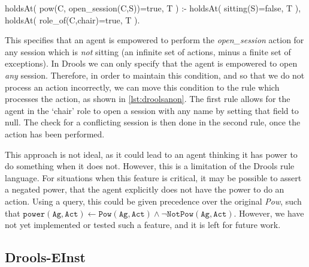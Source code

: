 \begin{prologinline}
holdsAt( pow(C, open_session(C,S))=true, T ) :-
	holdsAt( sitting(S)=false, T ),
	holdsAt( role_of(C,chair)=true, T ).
\end{prologinline}

This specifies that an agent is empowered to perform the \emph{open\_session}
action for any session which is \emph{not} sitting (\ie an infinite set of
actions, minus a finite set of exceptions). In Drools we can only specify that
the agent is empowered to open \emph{any} session. Therefore, in order to
maintain this condition, and so that we do not process an action incorrectly,
we can move this condition to the rule which processes the action, as shown in
\autoref{lst:droolsanon}. The first rule allows for the agent in the `chair'
role to open a session with any name by setting that field to null. The check
for a conflicting session is then done in the second rule, once the action has
been performed.


This approach is not ideal, as it could lead to an agent thinking it has power to do something when it does not. However, this is a limitation of the Drools rule language. For situations when this feature is critical, it may be possible to assert a negated power, \ie that the agent explicitly does not have the power to do an action. Using a query, this could be given precedence over the original \emph{Pow}, such that $$. However, we have not yet implemented or tested such a feature, and it is left for future work.

\subsection{Drools-EInst}

